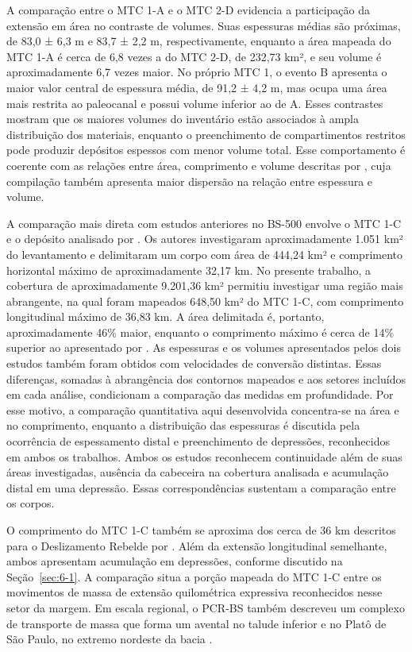 A comparação entre o MTC 1-A e o MTC 2-D evidencia a participação da extensão em área no contraste de volumes. Suas espessuras médias são próximas, de 83,0 ± 6,3 m e 83,7 ± 2,2 m, respectivamente, enquanto a área mapeada do MTC 1-A é cerca de 6,8 vezes a do MTC 2-D, de 232,73 km², e seu volume é aproximadamente 6,7 vezes maior. No próprio MTC 1, o evento B apresenta o maior valor central de espessura média, de 91,2 ± 4,2 m, mas ocupa uma área mais restrita ao paleocanal e possui volume inferior ao de A. Esses contrastes mostram que os maiores volumes do inventário estão associados à ampla distribuição dos materiais, enquanto o preenchimento de compartimentos restritos pode produzir depósitos espessos com menor volume total. Esse comportamento é coerente com as relações entre área, comprimento e volume descritas por , cuja compilação também apresenta maior dispersão na relação entre espessura e volume.

A comparação mais direta com estudos anteriores no BS-500 envolve o MTC 1-C e o depósito analisado por . Os autores investigaram aproximadamente 1.051 km² do levantamento e delimitaram um corpo com área de 444,24 km² e comprimento horizontal máximo de aproximadamente 32,17 km. No presente trabalho, a cobertura de aproximadamente 9.201,36 km² permitiu investigar uma região mais abrangente, na qual foram mapeados 648,50 km² do MTC 1-C, com comprimento longitudinal máximo de 36,83 km. A área delimitada é, portanto, aproximadamente 46\% maior, enquanto o comprimento máximo é cerca de 14\% superior ao apresentado por . As espessuras e os volumes apresentados pelos dois estudos também foram obtidos com velocidades de conversão distintas. Essas diferenças, somadas à abrangência dos contornos mapeados e aos setores incluídos em cada análise, condicionam a comparação das medidas em profundidade. Por esse motivo, a comparação quantitativa aqui desenvolvida concentra-se na área e no comprimento, enquanto a distribuição das espessuras é discutida pela ocorrência de espessamento distal e preenchimento de depressões, reconhecidos em ambos os trabalhos. Ambos os estudos reconhecem continuidade além de suas áreas investigadas, ausência da cabeceira na cobertura analisada e acumulação distal em uma depressão. Essas correspondências sustentam a comparação entre os corpos.

O comprimento do MTC 1-C também se aproxima dos cerca de 36 km descritos para o Deslizamento Rebelde por . Além da extensão longitudinal semelhante, ambos apresentam acumulação em depressões, conforme discutido na Seção~\ref{sec:6-1}. A comparação situa a porção mapeada do MTC 1-C entre os movimentos de massa de extensão quilométrica expressiva reconhecidos nesse setor da margem. Em escala regional, o PCR-BS também descreveu um complexo de transporte de massa que forma um avental no talude inferior e no Platô de São Paulo, no extremo nordeste da bacia \cite{petrobras2022}.

